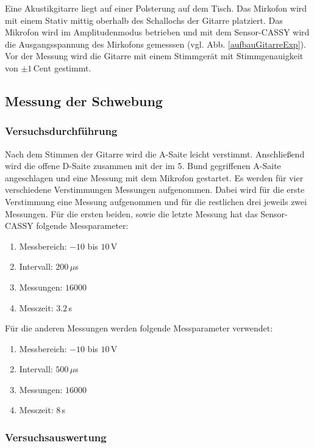 Eine Akustikgitarre liegt auf einer Polsterung auf dem Tisch. Das Mirkofon wird mit einem Stativ mittig oberhalb des Schallochs der Gitarre platziert. Das Mikrofon wird im Amplitudenmodus betrieben und mit dem Sensor-CASSY wird die Ausgangsspannung des Mirkofons gemesssen (vgl. Abb. \ref{aufbauGitarreExp}). Vor der Messung wird die Gitarre mit einem Stimmgerät mit Stimmgenauigkeit von $\pm 1 \, \mathrm{Cent}$ gestimmt.


\subsection{Messung der Schwebung}


\subsubsection{Versuchsdurchführung}

Nach dem Stimmen der Gitarre wird die A-Saite leicht verstimmt. Anschließend wird die offene D-Saite zusammen mit der im 5. Bund gegriffenen A-Saite angeschlagen und eine Messung mit dem Mikrofon gestartet. Es werden für vier verschiedene Verstimmungen Messungen aufgenommen. Dabei wird für die erste Verstimmung eine Messung aufgenommen und für die restlichen drei jeweils zwei Messungen. Für die ersten beiden, sowie die letzte Messung hat das Sensor-CASSY folgende Messparameter:
\begin{enumerate}[-]
\setlength{\itemsep}{-5pt} 
\item Messbereich: $-10$ bis $10\,$V
\item Intervall: $200\,\mu$s
\item Messungen: $16000$
\item Messzeit: $3.2\,$s
\end{enumerate}
Für die anderen Messungen werden folgende Messparameter verwendet:
\begin{enumerate}[-]
\setlength{\itemsep}{-5pt} 
\item Messbereich: $-10$ bis $10\,$V
\item Intervall: $500\,\mu$s
\item Messungen: $16000$
\item Messzeit: $8\,$s
\end{enumerate}


\subsubsection{Versuchsauswertung}

